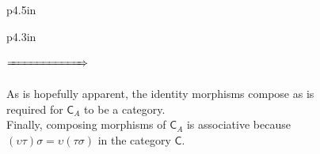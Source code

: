 \documentclass{book}
\newenvironment{myIndent}{%
   \begin{adjustwidth}{2.5em}{0em}%
}{%
   \end{adjustwidth}%
}
\newenvironment{myDindent}{%
   \begin{adjustwidth}{5em}{0em}%
}{%
   \end{adjustwidth}%
}
\newcommand{\mcateg}[1]{{\bm{\mathsf{#1}}}}
\newcommand{\retTwo}{\hfill\bigbreak}
\begin{document}
\begin{myIndent}
\begin{itemize}
{\begin{myDindent}
\begin{tabular}{p{4.5in}}
\begin{tabular}{p{4.3in}}
                  {
                  $\xRightarrow{\phantom{aaaaaaaaaaaaaaa}}$
                  }\retTwo
                  
                  As is hopefully apparent, the identity morphisms compose as is\\ required for $\mcateg{C}_A$ to be a category.\\ [6pt]

                  Finally, composing morphisms of $\mcateg{C}_A$ is associative because\\ $(\upsilon\tau)\sigma = \upsilon(\tau\sigma)$ in the category $\mcateg{C}$.
                  

\end{tabular}
\end{tabular}
\end{myDindent}}
\end{itemize}
\end{myIndent}
\end{document}
